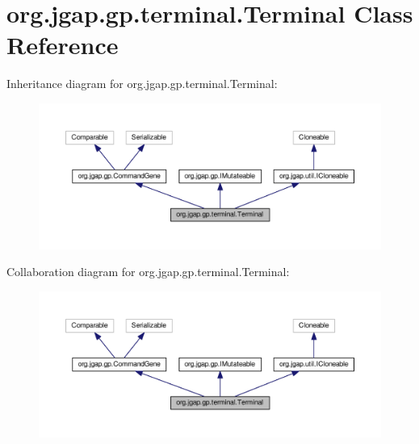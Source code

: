 \hypertarget{classorg_1_1jgap_1_1gp_1_1terminal_1_1_terminal}{\section{org.\-jgap.\-gp.\-terminal.\-Terminal Class Reference}
\label{classorg_1_1jgap_1_1gp_1_1terminal_1_1_terminal}
}


Inheritance diagram for org.\-jgap.\-gp.\-terminal.\-Terminal\-:
\nopagebreak
\begin{figure}[H]
\begin{center}
\leavevmode
\includegraphics[width=350pt]{classorg_1_1jgap_1_1gp_1_1terminal_1_1_terminal__inherit__graph}
\end{center}
\end{figure}


Collaboration diagram for org.\-jgap.\-gp.\-terminal.\-Terminal\-:
\nopagebreak
\begin{figure}[H]
\begin{center}
\leavevmode
\includegraphics[width=350pt]{classorg_1_1jgap_1_1gp_1_1terminal_1_1_terminal__coll__graph}
\end{center}
\end{figure}
